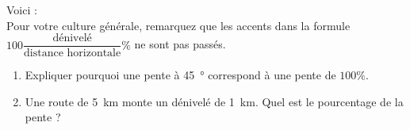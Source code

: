 
\begin{exercice}\label{exosmath-0836}

    Voici  :\\
Pour votre culture générale, remarquez que les accents dans la formule \( 100\dfrac{ \text{dénivelé} }{ \text{distance horizontale} }\%\) ne sont pas passés.

\begin{enumerate}
    \item
        Expliquer pourquoi une pente à \SI{45}{\degree} correspond à une pente de \( 100\%\).
    \item
        Une route de \SI{5}{\kilo\meter} monte un dénivelé de \SI{1}{\kilo\meter}. Quel est le pourcentage de la pente ?
\end{enumerate}

\end{exercice}
